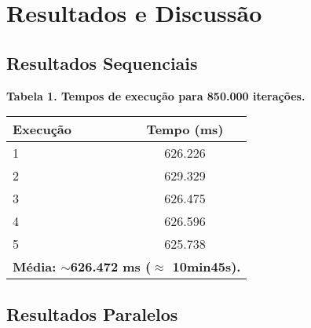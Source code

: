 \documentclass[12pt]{article}
\begin{document}
\section{Resultados e Discussão}
\subsection{Resultados Sequenciais}

\begin{center}
    \textbf{Tabela 1. Tempos de execução para 850.000 iterações.} \\
    \begin{tabular}{lcc}
        \toprule
        \textbf{Execução} & & \textbf{Tempo (ms)} \\
        \midrule
        1 & & 626.226 \\
        2 & & 629.329 \\
        3 & & 626.475 \\
        4 & & 626.596 \\
        5 & & 625.738 \\
        \midrule
        \multicolumn{3}{l}{\textbf{Média: $\sim$626.472 ms ($\approx$ 10min45s).}} \\
        \bottomrule
    \end{tabular}
\end{center}

\subsection{Resultados Paralelos}
\end{document}
